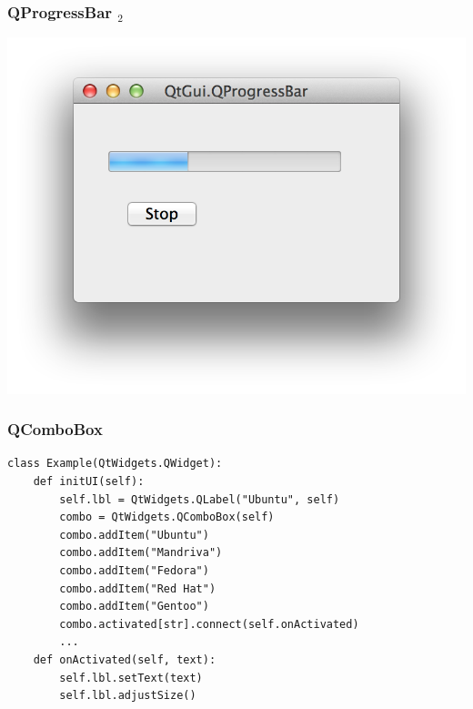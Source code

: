 \documentclass[utf8,compress,aspectratio=169]{beamer}
\begin{document}
\begin{frame}[fragile]
  \frametitle{QProgressBar $_2$}
\begin{center}
\includegraphics[scale=0.5]{pyqt15.png}
\end{center}
\end{frame}

\begin{frame}
  \frametitle{QComboBox}
\begin{verbatim}
class Example(QtWidgets.QWidget):
    def initUI(self):
        self.lbl = QtWidgets.QLabel("Ubuntu", self)
        combo = QtWidgets.QComboBox(self)
        combo.addItem("Ubuntu")
        combo.addItem("Mandriva")
        combo.addItem("Fedora")
        combo.addItem("Red Hat")
        combo.addItem("Gentoo")
        combo.activated[str].connect(self.onActivated)
        ...
    def onActivated(self, text):
        self.lbl.setText(text)
        self.lbl.adjustSize()
\end{verbatim}
\end{frame}
\end{document}
